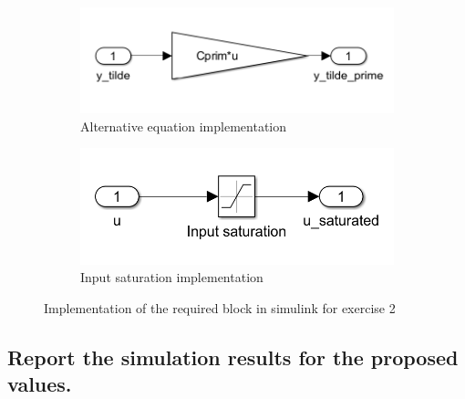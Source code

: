 \begin{figure}[H]
\begin{subfigure}[b]{0.45\textwidth}
         \centering
         \includegraphics[width=\textwidth]{Latex report/image/ex2altEq.png}
         \caption{Alternative equation implementation}
         \label{fig:altEqSim}
     \end{subfigure}
     \begin{subfigure}[b]{0.45\textwidth}
         \centering
         \includegraphics[width=\textwidth]{Latex report/image/ex2Saturation.png}
         \caption{Input saturation implementation}
         \label{fig:simSat}
     \end{subfigure}
    \caption{Implementation of the required block in simulink for exercise 2}
    \label{fig:simImplEx2}
\end{figure}

\subsection{Report the simulation results for the proposed values.}

